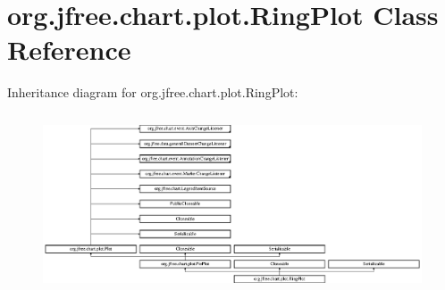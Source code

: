 \hypertarget{classorg_1_1jfree_1_1chart_1_1plot_1_1_ring_plot}{}\section{org.\+jfree.\+chart.\+plot.\+Ring\+Plot Class Reference}
\label{classorg_1_1jfree_1_1chart_1_1plot_1_1_ring_plot}
Inheritance diagram for org.\+jfree.\+chart.\+plot.\+Ring\+Plot\+:\begin{figure}[H]
\begin{center}
\leavevmode
\includegraphics[height=5.310345cm]{classorg_1_1jfree_1_1chart_1_1plot_1_1_ring_plot}
\end{center}
\end{figure}
